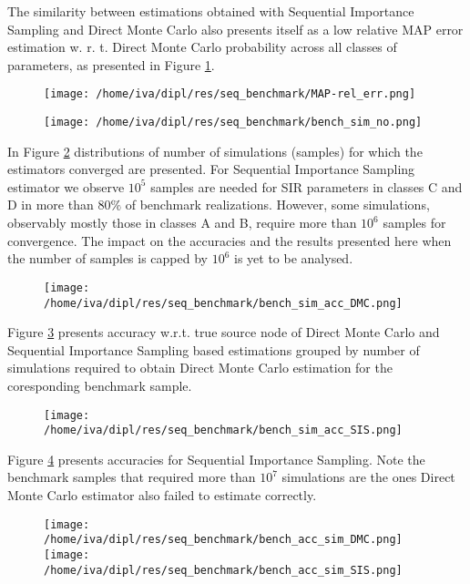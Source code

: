 \documentclass[times, utf8, diplomski]{fer}
\begin{document}
The similarity between estimations obtained with Sequential Importance Sampling and Direct Monte Carlo also presents itself as a low relative MAP error estimation w. r. t. Direct Monte Carlo probability across all classes of parameters, as presented in Figure \ref{rel_err}.
\begin{figure}[H]
\texttt{[image: /home/iva/dipl/res/seq\_benchmark/MAP-rel\_err.png]}
\caption{}
\label{rel_err}
\end{figure}

\begin{figure}[H]
\texttt{[image: /home/iva/dipl/res/seq\_benchmark/bench\_sim\_no.png]}
\caption{}
\label{bench_sim_no}
\end{figure}
In Figure \ref{bench_sim_no} distributions of number of simulations (samples) for which the estimators converged are presented. For Sequential Importance Sampling estimator we observe $10^5$ samples are needed for SIR parameters in classes C and D in more than $80\%$ of benchmark realizations. However, some simulations, observably mostly those in classes A and B, require more than $10^6$ samples for convergence. The impact on the accuracies and the results presented here when the number of samples is capped by $10^6$ is yet to be analysed. 

\begin{figure}[H]
\texttt{[image: /home/iva/dipl/res/seq\_benchmark/bench\_sim\_acc\_DMC.png]}
\caption{}
\label{bench_sim_accDMC}
\end{figure}
Figure \ref{bench_sim_accDMC} presents accuracy w.r.t. true source node of Direct Monte Carlo and Sequential Importance Sampling based estimations grouped by number of simulations required to obtain Direct Monte Carlo estimation for the coresponding benchmark sample. 
	
\begin{figure}[H]
\texttt{[image: /home/iva/dipl/res/seq\_benchmark/bench\_sim\_acc\_SIS.png]}
\caption{}
\label{bench_sim_accSIS}
\end{figure}
Figure \ref{bench_sim_accSIS} presents accuracies for Sequential Importance Sampling. Note the benchmark samples that required more than $10^7$ simulations are the ones Direct Monte Carlo estimator also failed to estimate correctly.  

\begin{figure}[H]
\texttt{[image: /home/iva/dipl/res/seq\_benchmark/bench\_acc\_sim\_DMC.png]}
\texttt{[image: /home/iva/dipl/res/seq\_benchmark/bench\_acc\_sim\_SIS.png]}
\caption{}
\label{bench_acc_simDMC}
\end{figure}
\end{document}
